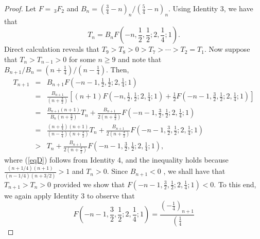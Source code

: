 \documentclass[final]{siamltex}
\begin{document}
\begin{proof}
Let $F=\,_{3}F_{2}$ and $\displaystyle %
B_{n}=\left( \mbox{$\frac{3}{4}$}-n\right) _{n}/\left( \mbox{$\frac{5}{4}$}%
-n\right) _{n}$. Using Identity 3, we have that 
\[
T_{n}=B_{n}F\left( -n,\mbox{$\frac{1}{2}$},\mbox{$\frac{1}{2}$};2,%
\mbox{$\frac{1}{4}$};1\right) . 
\]
Direct calculation reveals that $%
T_{9}>T_{8}>0>T_{7}>\cdots>T_{2}=T_{1}$. Now suppose that $T_{n}>T_{n-1}>0$ for
some $n\geq 9$ and note that $\displaystyle   B_{n+1}/B_{n}=\left( n+%
\mbox{$\frac{1}{4}$}\right) /\left( n-\mbox{$\frac{1}{4}$}\right) $. Then, 
\begin{eqnarray}
T_{n+1} &=&B_{n+1}F\left( -n-1,\mbox{$\frac{1}{2}$},%
\mbox{$\frac{1}{2}$};2,\mbox{$\frac{1}{4}$};1\right) \nonumber \\
&=&\frac{B_{n+1}}{\left( n+\mbox{$\frac{3}{2}$}\right) }\left[ (n+1)F\left(
-n,\mbox{$\frac{1}{2}$},\mbox{$\frac{1}{2}$};2,\mbox{$\frac{1}{4}$};1\right)  
+ \mbox{$\frac{1}{2}$}F\left( -n-1,\mbox{$\frac{3}{2}$},\mbox{$\frac{1}{2}$}%
;2,\mbox{$\frac{1}{4}$};1\right) \right]  \label{eqD} \\
&=&\frac{B_{n+1}(n+1)}{B_{n}\left( n+\mbox{$\frac{3}{2}$}\right) }T_{n} 
+\frac{B_{n+1}}{2\left( n+\mbox{$\frac{3}{2}$}\right) }F\left( -n-1,%
\mbox{$\frac{3}{2}$},\mbox{$\frac{1}{2}$};2,\mbox{$\frac{1}{4}$};1\right) \nonumber \\
&=&\frac{\left( n+\mbox{$\frac{1}{4}$}\right) (n+1)}{\left( n-%
\mbox{$\frac{1}{4}$}\right) \left( n+\mbox{$\frac{3}{2}$}\right) }T_{n} 
+\frac{B_{n+1}}{2\left( n+\mbox{$\frac{3}{2}$}\right) }F\left( -n-1,%
\mbox{$\frac{3}{2}$},\mbox{$\frac{1}{2}$};2,\mbox{$\frac{1}{4}$};1\right) \nonumber \\
&>&T_{n}+\frac{B_{n+1}}{2\left( n+\mbox{$\frac{3}{2}$}\right) }F\left( -n-1,%
\mbox{$\frac{3}{2}$},\mbox{$\frac{1}{2}$};2,\mbox{$\frac{1}{4}$};1\right), \nonumber 
\end{eqnarray}
where (\ref{eqD}) follows from Identity 4, and the inequality holds because
$\frac{(n+1/4)(n+1)}{(n-1/4)(n+3/2)} >1$ and $T_{n} > 0$. Since $B_{n+1}<0$%
, we shall have that $T_{n+1}>T_{n}>0$ provided we show that $F(-n-1,%
\mbox{$\frac{3}{2}$},\mbox{$\frac{1}{2}$};2,\mbox{$\frac{1}{4}$};1)<0$. To
this end, we again apply Identity 3 to observe that 
\[
F\left( -n-1,\mbox{$\frac{3}{2}$},\mbox{$\frac{1}{2}$};2,\mbox{$\frac{1}{4}$}%
;1\right) =\frac{\left( -\frac{1}{4}\right) _{n+1}}{\left( \frac{1}{4}%
}\]
\end{proof}
\end{document}
